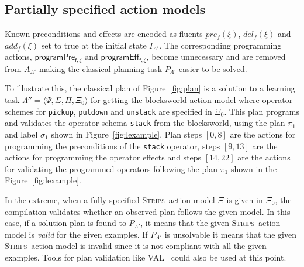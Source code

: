 \documentclass[letterpaper]{article} %
\newcommand{\tup}[1]{{\langle #1 \rangle}}
\newcommand{\strips}{\textsc{Strips}}     %
\begin{document}
\subsection{Partially specified action models}
Known preconditions and effects are encoded as fluents $pre_f(\xi)$, $del_f(\xi)$ and $add_f(\xi)$ set to true at the initial state $I_{\Lambda'}$. The corresponding programming actions, $\mathsf{programPre_{f,\xi}}$ and $\mathsf{programEff_{f,\xi}}$, become unnecessary and are removed from $A_{\Lambda'}$ making the classical planning task $P_{\Lambda'}$ easier to be solved.

To illustrate this, the classical plan of Figure~\ref{fig:plan} is a solution to a learning task $\Lambda''=\tup{\Psi,\Sigma,\Pi,\Xi_0}$ for getting the blocksworld action model where operator schemes for {\tt\small pickup}, {\tt\small putdown} and {\tt\small unstack} are specified in $\Xi_0$. This plan programs and validates the operator schema {\tt\small stack} from the blocksworld, using the plan $\pi_1$ and label $\sigma_1$ shown in Figure~\ref{fig:lexample}. Plan steps $[0,8]$ are the actions for programming the preconditions of the {\tt\small stack} operator, steps $[9,13]$ are the actions for programming the operator effects and steps $[14,22]$ are the actions for validating the programmed operators following the plan $\pi_1$ shown in the Figure~\ref{fig:lexample}.

In the extreme, when a fully specified \strips\ action model $\Xi$ is given in $\Xi_0$, the compilation validates whether an observed plan follows the given model. In this case, if a solution plan is found to $P_{\Lambda'}$, it means that the given \strips\ action model is {\em valid} for the given examples. If $P_{\Lambda'}$ is unsolvable it means that the given \strips\ action model is invalid since it is not compliant with all the given examples. Tools for plan validation like VAL~\cite{howey2004val} could also be used at this point.
\end{document}
